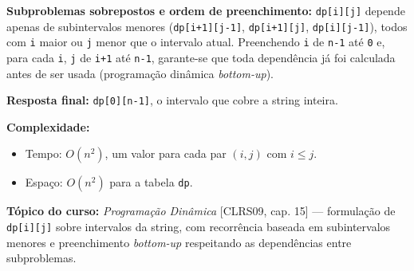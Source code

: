 \textbf{Subproblemas sobrepostos e ordem de preenchimento:}
\texttt{dp[i][j]} depende apenas de subintervalos menores
(\texttt{dp[i+1][j-1]}, \texttt{dp[i+1][j]}, \texttt{dp[i][j-1]}), todos com
\texttt{i} maior ou \texttt{j} menor que o intervalo atual. Preenchendo
\texttt{i} de \texttt{n-1} até \texttt{0} e, para cada \texttt{i},
\texttt{j} de \texttt{i+1} até \texttt{n-1}, garante-se que toda dependência
já foi calculada antes de ser usada (programação dinâmica \emph{bottom-up}).

\textbf{Resposta final:} \texttt{dp[0][n-1]}, o intervalo que cobre a string
inteira.

\textbf{Complexidade:}
\begin{itemize}
    \item Tempo: $O(n^2)$, um valor para cada par $(i, j)$ com
    $i \leq j$.
    \item Espaço: $O(n^2)$ para a tabela \texttt{dp}.
\end{itemize}

\textbf{Tópico do curso:} \emph{Programação Dinâmica} [CLRS09, cap. 15] ---
formulação de \texttt{dp[i][j]} sobre intervalos da string, com recorrência
baseada em subintervalos menores e preenchimento \emph{bottom-up} respeitando
as dependências entre subproblemas.
